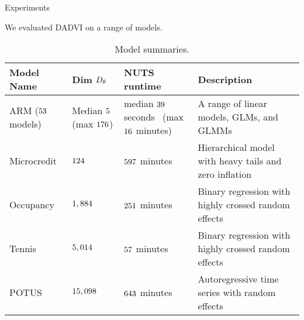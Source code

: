 \documentclass[8pt]{beamer}\usepackage[]{graphicx}\usepackage[]{color}
\begin{document}
\begin{frame}{Experiments}

    We evaluated DADVI on a range of models.
    
    \begin{table}[h!]
        \begin{tabular}{|x{0.15\textwidth}|x{0.13\textwidth}|x{0.25\textwidth}|x{0.3\textwidth}|}
        \hline\hline
        Model Name  & Dim ${D_{\theta}}$     & NUTS runtime & Description \\
        \hline\hline
        ARM  \newline ($53$ models) &
        Median $5$ 
            \newline(max $176$)&
        median $39$ seconds \
            \newline(max $16$ minutes) 
            &
           A range of linear models, GLMs, and GLMMs \\
        \hline
        Microcredit & $124$ & $597$ minutes &
           Hierarchical model with heavy tails and zero inflation \\
        \hline
        Occupancy & $1,884$ & $251$ minutes &
           Binary regression with highly crossed random effects \\
        \hline
        Tennis & $5,014$ & $57$ minutes &
           Binary regression with highly crossed random effects \\
        \hline
        POTUS & $15,098$ & $643$ minutes &
            Autoregressive time series with random effects \\
        \hline\hline
        \end{tabular}
        \caption{Model summaries.}
        \label{tab:model_desc}
    \end{table}
        
\end{frame}

\end{document}
